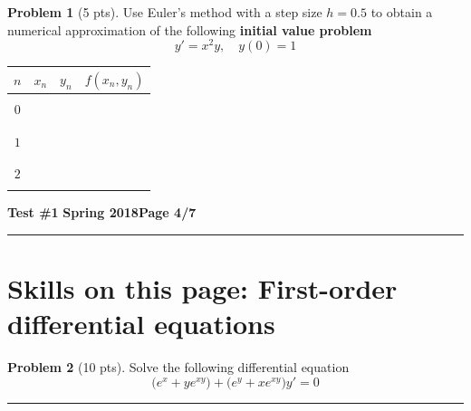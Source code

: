 \documentclass[12pt]{article}
\theoremstyle{definition}
\newtheorem{problem}{Problem}
\begin{document}
\begin{problem}[5 pts]
Use Euler's method with a step size $h=0.5$ to obtain a numerical approximation of the following \textbf{initial value problem}
\begin{equation*}
y' = x^2y, \quad y(0)=1
\end{equation*}
\vspace{5cm}
\begin{flushright}
\begin{tabular}{|c||c|c|c|}
\hline
$n$ & $x_n$ & $y_n$ & $f(x_n, y_n)$ \\ 
\hline \hline
&&& \\
$0$ & \hspace{0.5cm} & \hspace{1cm} & \hspace{3cm} \\
&&& \\ \hline
&&& \\
$1$ &&& \\
&&& \\ \hline
&&& \\
$2$ &&& \\
&&& \\ \hline
\end{tabular}
\end{flushright}
\end{problem}
\newpage


\hfill{\large\bf Test \#1}\hfill{\large\bf
Spring 2018}\hfill{\large\bf Page 4/7}\hrule

\section*{Skills on this page: First-order differential equations}

\begin{problem}[10 pts]
Solve the following differential equation
\begin{equation*}
\big(e^x+y e^{xy}\big) + \big( e^y+xe^{xy}\big)y' = 0
\end{equation*}

\vspace{6.5cm}
\begin{flushright}
\end{flushright}
\end{problem}
\hrule
\end{document}
